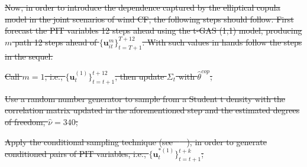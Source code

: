 \documentclass[a4paper]{IEEEtran}
\providecommand{\DIFdel}[1]{{\protect\color{red}\sout{#1}}}                      %
\begin{document}

\DIFdel{Now, in order to introduce the dependence captured by the elliptical copula model in the joint scenarios of wind CF, the following steps should follow. First forecast the PIT variables 12 steps ahead using the t-GAS (1,1) model, producing $m$ path 12 steps ahead of $\{\mathbf{u}^{m}_{it}\}_{t=T+1}^{T+12}$. With such values in hands follow the steps in the sequel.
   }%

\DIFdel{Call $m=1$, i.e., $\{\mathbf{u}_{t}^{(1)}\}_{t=t+1}^{t+12}$, then update $\Sigma_{t}$ with $\hat{\theta}^{cop}$;
}%

\DIFdel{Use a random number generator to sample from a Student t density with the correlation matrix updated in the aforementioned step and the estimated degrees of freedom, $\hat{\nu}=340$;
}%

\DIFdel{Apply the conditional sampling technique (see \mbox{%
\cite{cherubini2004copula}
}%
), in order to generate conditioned pairs of PIT variables, i.e., $\{\mathbf{u}_{t}^{*(1) }\}_{t=t+1}^{t+k}$;
 }%
\end{document}
